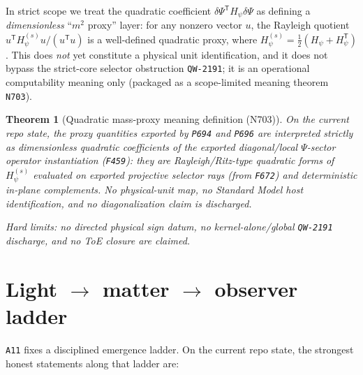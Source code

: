 \documentclass[11pt,a4paper]{article}
\newtheorem{theorem}{Theorem}[section]
\begin{document}
In strict scope we treat the quadratic coefficient $\delta\Psi^{\mathsf T}H_{\psi}\delta\Psi$ as defining a \emph{dimensionless} “$m^2$ proxy” layer:
for any nonzero vector $u$, the Rayleigh quotient
$u^{\mathsf T}H_{\psi}^{(s)}u/(u^{\mathsf T}u)$ is a well-defined quadratic proxy, where $H_{\psi}^{(s)}=\tfrac12(H_{\psi}+H_{\psi}^{\mathsf T})$.
This does \emph{not} yet constitute a physical unit identification, and it does not bypass the strict-core selector obstruction \texttt{QW-2191};
it is an operational computability meaning only (packaged as a scope-limited meaning theorem \texttt{N703}).

\begin{theorem}[Quadratic mass-proxy meaning definition (N703)]
On the current repo state, the proxy quantities exported by \texttt{P694} and \texttt{P696} are interpreted strictly as \emph{dimensionless quadratic coefficients}
of the exported diagonal/local $\Psi$-sector operator instantiation (\texttt{F459}):
they are Rayleigh/Ritz-type quadratic forms of $H_{\psi}^{(s)}$ evaluated on exported projective selector rays (from \texttt{F672}) and deterministic in-plane complements.
No physical-unit map, no Standard Model host identification, and no diagonalization claim is discharged.

\emph{Hard limits:} no directed physical sign datum, no kernel-alone/global \texttt{QW-2191} discharge, and no ToE closure are claimed.
\end{theorem}
\section{Light $\to$ matter $\to$ observer ladder}

\texttt{A11} fixes a disciplined emergence ladder. On the current repo state, the strongest honest statements along that ladder are:
\end{document}
